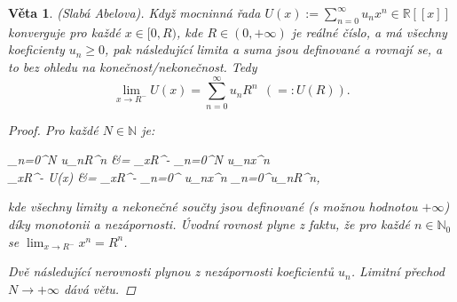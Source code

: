 \documentclass[10pt,a4paper]{article}
\newcommand{\R}{{\mathbb{R}}}       %
\newcommand{\N}{{\mathbb{N}}}       %
\newtheorem*{thm}{Věta}
\begin{document}
\begin{thm} (Slabá Abelova). Když mocninná řada $\displaystyle U(x):= \sum_{n=0}^{\infty}u_nx^n \in \R[[x]]$ konverguje pro každé $x \in [0,R)$, kde $R \in (0, +\infty)$ je reálné číslo, a má všechny koeficienty $u_n\geq 0$, pak následující limita a suma jsou definované a rovnají se, a to bez ohledu na konečnost/nekonečnost. Tedy
	\[\lim_{x\to R^{-}} U(x) = \sum_{n=0}^{\infty} u_nR^n ~~(=:U(R)).\]
	\begin{proof}
		Pro každé $N \in \N$ je:
		\begin{flalign*}
			 \sum_{n=0}^{N} u_nR^n &= \lim_{x\to R^-} \sum_{n=0}^{N} u_nx^n \\
			 \leq \lim_{x\to R^-} U(x) &= \lim_{x\to R^-} \sum_{n=0}^{\infty} u_nx^n \leq \sum_{n=0}^{\infty}u_nR^n,
		\end{flalign*}
		kde všechny limity a nekonečné součty jsou definované \textit{(s možnou hodnotou $+\infty$)} díky monotonii a nezápornosti. Úvodní rovnost plyne z faktu, že pro každé $n \in \N_0$ se $\lim_{x\to R^-} x^n = R^n$. 
		
		Dvě následující nerovnosti plynou z nezápornosti koeficientů $u_n$. Limitní přechod $N \to +\infty$ dává větu.
	\end{proof}
\end{thm}
\end{document}
